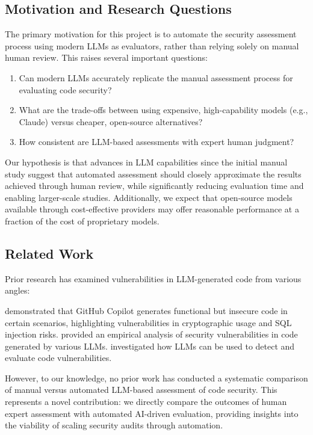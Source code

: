 \documentclass[12pt]{article}
\begin{document}
\subsection{Motivation and Research Questions}
 
The primary motivation for this project is to automate the security assessment process using modern LLMs as evaluators, rather than relying solely on manual human review. This raises several important questions:
 
\begin{enumerate}
    \item Can modern LLMs accurately replicate the manual assessment process for evaluating code security?
    \item What are the trade-offs between using expensive, high-capability models (e.g., Claude) versus cheaper, open-source alternatives?
    \item How consistent are LLM-based assessments with expert human judgment?
\end{enumerate}
 
Our hypothesis is that advances in LLM capabilities since the initial manual study suggest that automated assessment should closely approximate the results achieved through human review, while significantly reducing evaluation time and enabling larger-scale studies. Additionally, we expect that open-source models available through cost-effective providers may offer reasonable performance at a fraction of the cost of proprietary models.
 
\subsection{Related Work}
 
Prior research has examined vulnerabilities in LLM-generated code from various angles:
 
\citet{pearce2022asleep} demonstrated that GitHub Copilot generates functional but insecure code in certain scenarios, highlighting vulnerabilities in cryptographic usage and SQL injection risks. \citet{sandoval2023empirical} provided an empirical analysis of security vulnerabilities in code generated by various LLMs. \citet{Kolosnjaji2024} investigated how LLMs can be used to detect and evaluate code vulnerabilities.
 
However, to our knowledge, no prior work has conducted a systematic comparison of manual versus automated LLM-based assessment of code security. This represents a novel contribution: we directly compare the outcomes of human expert assessment with automated AI-driven evaluation, providing insights into the viability of scaling security audits through automation.
 
\end{document}
